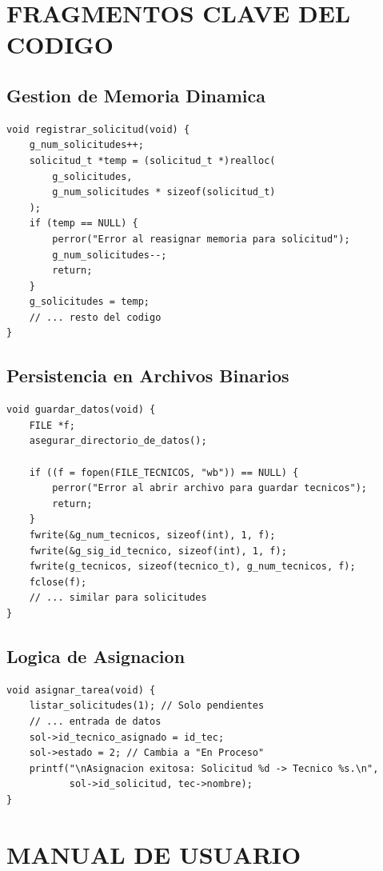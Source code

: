 \documentclass[12pt, a4paper]{article}
\begin{document}
\section{FRAGMENTOS CLAVE DEL CODIGO}

\subsection{Gestion de Memoria Dinamica}
\begin{lstlisting}
void registrar_solicitud(void) {
    g_num_solicitudes++;
    solicitud_t *temp = (solicitud_t *)realloc(
        g_solicitudes,
        g_num_solicitudes * sizeof(solicitud_t)
    );
    if (temp == NULL) {
        perror("Error al reasignar memoria para solicitud");
        g_num_solicitudes--;
        return;
    }
    g_solicitudes = temp;
    // ... resto del codigo
}
\end{lstlisting}

\subsection{Persistencia en Archivos Binarios}
\begin{lstlisting}
void guardar_datos(void) {
    FILE *f;
    asegurar_directorio_de_datos();

    if ((f = fopen(FILE_TECNICOS, "wb")) == NULL) {
        perror("Error al abrir archivo para guardar tecnicos");
        return;
    }
    fwrite(&g_num_tecnicos, sizeof(int), 1, f);
    fwrite(&g_sig_id_tecnico, sizeof(int), 1, f);
    fwrite(g_tecnicos, sizeof(tecnico_t), g_num_tecnicos, f);
    fclose(f);
    // ... similar para solicitudes
}
\end{lstlisting}

\subsection{Logica de Asignacion}
\begin{lstlisting}
void asignar_tarea(void) {
    listar_solicitudes(1); // Solo pendientes
    // ... entrada de datos
    sol->id_tecnico_asignado = id_tec;
    sol->estado = 2; // Cambia a "En Proceso"
    printf("\nAsignacion exitosa: Solicitud %d -> Tecnico %s.\n",
           sol->id_solicitud, tec->nombre);
}
\end{lstlisting}

\section{MANUAL DE USUARIO}
\end{document}
